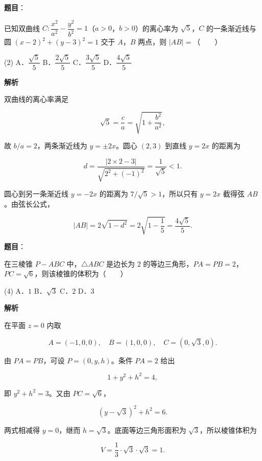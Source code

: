 \begin{answer}

\textbf{题目}：

已知双曲线 $C:\dfrac{x^2}{a^2}-\dfrac{y^2}{b^2}=1$（$a>0$，$b>0$）的离心率为 $\sqrt5$，$C$ 的一条渐近线与圆 $(x-2)^2+(y-3)^2=1$ 交于 $A$，$B$ 两点，则 $|AB|=$\mbox{（　　）}

\begin{gkopts}(2)
\task A．$\dfrac{\sqrt5}{5}$
\task B．$\dfrac{2\sqrt5}{5}$
\task C．$\dfrac{3\sqrt5}{5}$
\task D．$\dfrac{4\sqrt5}{5}$
\end{gkopts}

\textbf{解析}

双曲线的离心率满足

\nopagebreak[4]
\[
\sqrt5=\frac ca=\sqrt{1+\frac{b^2}{a^2}},
\]

故 $b/a=2$，两条渐近线为 $y=\pm2x$。圆心 $(2,3)$ 到直线 $y=2x$ 的距离为

\nopagebreak[4]
\[
d=\frac{|2\times2-3|}{\sqrt{2^2+(-1)^2}}=\frac1{\sqrt5}<1.
\]

圆心到另一条渐近线 $y=-2x$ 的距离为 $7/\sqrt5>1$，所以只有 $y=2x$ 截得弦 $AB$。由弦长公式，

\nopagebreak[4]
\[
|AB|=2\sqrt{1-d^2}
=2\sqrt{1-\frac15}
=\frac{4\sqrt5}{5}.
\]


\end{answer}
\begin{answer}

\textbf{题目}：

在三棱锥 $P-ABC$ 中，$\triangle ABC$ 是边长为 $2$ 的等边三角形，$PA=PB=2$，$PC=\sqrt6$，则该棱锥的体积为\mbox{（　　）}

\begin{gkopts}(4)
\task A．$1$
\task B．$\sqrt3$
\task C．$2$
\task D．$3$
\end{gkopts}

\textbf{解析}

在平面 $z=0$ 内取

\nopagebreak[4]
\[
A=(-1,0,0),\quad B=(1,0,0),\quad C=(0,\sqrt3,0).
\]

由 $PA=PB$，可设 $P=(0,y,h)$。条件 $PA=2$ 给出

\nopagebreak[4]
\[
1+y^2+h^2=4,
\]

即 $y^2+h^2=3$。又由 $PC=\sqrt6$，

\nopagebreak[4]
\[
(y-\sqrt3)^2+h^2=6.
\]

两式相减得 $y=0$，继而 $h=\sqrt3$。底面等边三角形面积为 $\sqrt3$，所以棱锥体积为

\nopagebreak[4]
\[
V=\frac13\cdot\sqrt3\cdot\sqrt3=1.
\]


\end{answer}
